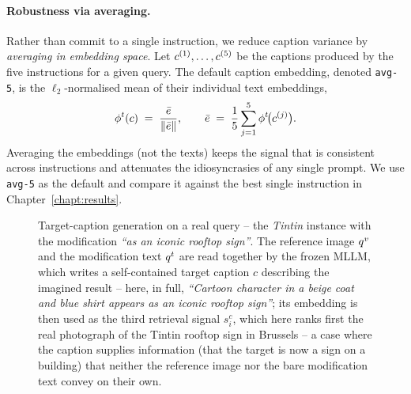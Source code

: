 \paragraph{Robustness via averaging.} Rather than commit to a single
instruction, we reduce caption variance by \emph{averaging in embedding space}.
Let $c^{(1)}, \dots, c^{(5)}$ be the captions produced by the five
instructions for a given query. The default caption embedding, denoted
\texttt{avg-5}, is the $\ell_2$-normalised mean of their individual text
embeddings,
\begin{equation}\label{eq:avg5}
    \phi^{t}(c) \;=\; \frac{\bar{e}}{\lVert \bar{e}\rVert},
    \qquad
    \bar{e} \;=\; \frac{1}{5}\sum_{j=1}^{5}\phi^{t}\!\big(c^{(j)}\big).
\end{equation}
Averaging the embeddings (not the texts) keeps the signal that is consistent
across instructions and attenuates the idiosyncrasies of any single prompt. We
use \texttt{avg-5} as the default and compare it against the best single
instruction in Chapter~\ref{chapt:results}.

\begin{figure}[H]
\centering
\resizebox{\textwidth}{!}{}
\caption[Example of target-caption generation.]{Target-caption generation on a
real query -- the \emph{Tintin} instance with the modification \emph{``as an
iconic rooftop sign''}. The reference image $q^{v}$ and the modification text
$q^{t}$ are read together by the frozen MLLM, which writes a self-contained
target caption $c$ describing the imagined result -- here, in full,
\emph{``Cartoon character in a beige coat and blue shirt appears as an iconic
rooftop sign''}; its embedding is then used
as the third retrieval signal $s^c_i$, which here ranks first the real
photograph of the Tintin rooftop sign in Brussels -- a case where the caption
supplies information (that the target is now a sign on a building) that
neither the reference image nor the bare modification text convey on their
own.\label{fig:caption_example}}
\end{figure}

